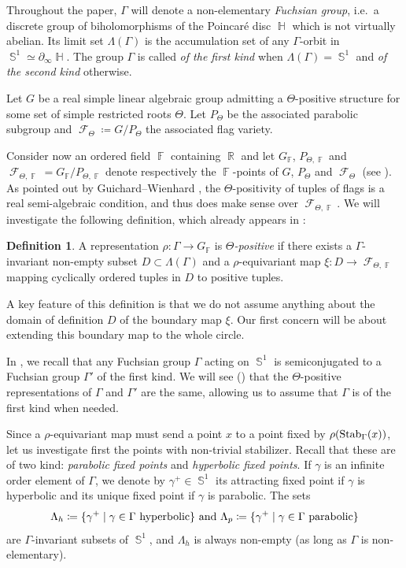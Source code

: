 \documentclass{amsart}
\theoremstyle{plain}
\theoremstyle{definition}
\newtheorem{definition}[proposition]{Definition}
\DeclareMathOperator{\Fc}{\mathcal{F}}
\DeclareMathOperator{\Fb}{{\mathbb{F}}}
\DeclareMathOperator{\Hb}{\mathbb{H}}
\DeclareMathOperator{\Rb}{{\mathbb{R}}}
\DeclareMathOperator{\Sb}{\mathbb{S}}
\newcommand*\from{\colon}
\newcommand{\Stab}{\textnormal{Stab}}
\newcommand{\1}{\mathbf{1}}
\begin{document}
Throughout the paper, $\Gamma$ will denote a non-elementary \emph{Fuchsian group}, i.e.\ a discrete group of biholomorphisms of the Poincar\'e disc $\Hb$ which is not virtually abelian. Its limit set $\Lambda(\Gamma)$ is the accumulation set of any $\Gamma$-orbit in $\Sb^1 \simeq \partial_\infty \Hb$. The group $\Gamma$ is called \emph{of the first kind} when $\Lambda(\Gamma) = \Sb^1$ and \emph{of the second kind} otherwise.

Let $G$ be a real simple linear algebraic group admitting a $\Theta$-positive structure for some set of simple restricted roots $\Theta$. Let $P_\Theta$ be the associated parabolic subgroup and $\Fc_\Theta \coloneqq G/P_\Theta$ the associated flag variety.

Consider now an ordered field $\Fb$ containing $\Rb$ and let $G_{\Fb}$, $P_{\Theta,\Fb}$ and $\Fc_{\Theta,\Fb}= G_{\Fb}/P_{\Theta,\Fb}$ denote respectively the $\Fb$-points of $G$, $P_\Theta$ and $\Fc_\Theta$ (see ).
As pointed out by Guichard--Wienhard \cite{guichard2025generalizing}, the $\Theta$-positivity of tuples of flags is a real semi-algebraic condition, and thus does make sense over $\Fc_{\Theta, \Fb}$.
We will investigate the following definition, which already appears in \cite{GLW}:
\begin{definition} \label{def: positive rep intro}
    A representation $\rho \from \Gamma \to G_{\Fb}$ is \emph{$\Theta$-positive} if there exists a $\Gamma$-invariant non-empty subset $D\subset \Lambda(\Gamma)$ and a $\rho$-equivariant map $\xi \from D \to \Fc_{\Theta,\Fb}$ mapping cyclically ordered tuples in $D$ to positive tuples.
\end{definition}

A key feature of this definition is that we do not assume anything about the domain of definition $D$ of the boundary map $\xi$. Our first concern will be about extending this boundary map to the whole circle. 

In , we recall that any Fuchsian group $\Gamma$ acting on $\Sb^1$ is semiconjugated to a Fuchsian group $\Gamma'$ of the first kind. We will see () that the $\Theta$-positive representations of $\Gamma$ and $\Gamma'$ are the same, allowing us to assume that $\Gamma$ is of the first kind when needed.

Since a $\rho$-equivariant map must send a point $x$ to a point fixed by $\rho(\Stab_\Gamma(x))$, let us investigate first the points with non-trivial stabilizer. Recall that these are of two kind: \emph{parabolic fixed points} and \emph{hyperbolic fixed points}. If $\gamma$ is an infinite order element of $\Gamma$, we denote by $\gamma^+ \in \Sb^1$ its attracting fixed point if $\gamma$ is hyperbolic and its unique fixed point if $\gamma$ is parabolic. The sets
\[\Lambda_h \coloneqq \{\gamma^+ \mid \gamma\in \Gamma \textrm{ hyperbolic}\} \textnormal{ and } \Lambda_p \coloneqq \{\gamma^+\mid \gamma\in \Gamma \textrm{ parabolic}\}\]
are $\Gamma$-invariant subsets of $\Sb^1$, and $\Lambda_h$ is always non-empty (as long as $\Gamma$ is non-elementary).\\
\end{document}
